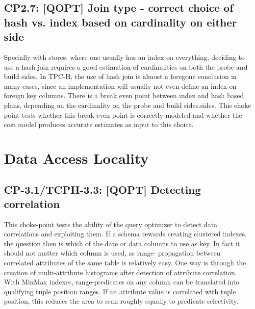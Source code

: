 %

\subsection*{CP2.7: [QOPT] Join type - correct choice of hash vs. index based on cardinality on either side}
\label{choke_point_2.7}
Specially with stores, where one usually has an index on everything, deciding to use a hash join requires a good estimation of cardinalities on both the probe and build sides. In TPC-H, the use of hash join is almost a foregone conclusion in many cases, since an implementation will usually not even define an index on foreign key columns. There is a break even point between index and hash based plans, depending on the cardinality on the probe and build sides.sides. This choke point tests whether this break-even point is correctly modeled and whether the cost model produces accurate estimates as input to this choice.

%


\section{Data Access Locality}

\subsection*{CP-3.1/TCPH-3.3: [QOPT]  Detecting correlation}
\label{choke_point_3.1}
This choke-point tests the ability of the query optimizer to detect data correlations and exploiting them. If a schema rewards creating clustered indexes, the question then is which of the date or data columns to use as key.
In fact it should not matter which column is used, as range- propagation between correlated attributes of the same table is relatively easy. One way is through the creation of multi-attribute histograms after detection of attribute correlation.
With MinMax indexes, range-predicates on any column can be translated into qualifying tuple position ranges. If an attribute value is correlated with tuple position, this reduces the area to scan roughly equally to predicate selectivity.



